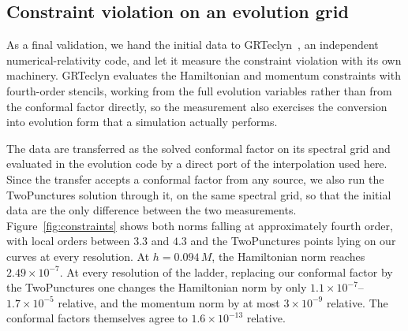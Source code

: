 \documentclass[
  aps,
  prd,
  twocolumn,
  10pt,
  amsmath,
  amssymb,
  nofootinbib,
  superscriptaddress,
  floatfix,
]{revtex4-2}
\begin{document}
\subsection{Constraint violation on an evolution grid}
\label{sec:validation:constraints}

As a final validation, we hand the initial data to GR\-Teclyn~\cite{GRTeclyn}, an
independent numerical-relativity code, and let it measure the
constraint violation with its own machinery. GRTeclyn evaluates the Hamiltonian
and momentum constraints with fourth-order stencils, working from the full evolution
variables rather than from the conformal factor directly, so
the measurement also exercises the conversion into evolution form that a
simulation actually performs.

The data are transferred as the solved conformal factor on its spectral grid and
evaluated in the evolution code by a direct port of the interpolation used here.
Since the transfer accepts a conformal factor from any source, we also run the TwoPunctures solution through
it, on the same spectral grid, so that the initial data are the only difference
between the two measurements. Figure~\ref{fig:constraints} shows both norms
falling at approximately fourth order, with local orders between $3.3$ and $4.3$ and the TwoPunctures points lying on our curves at every resolution.
At $h=0.094\,M$, the Hamiltonian norm reaches $2.49\times10^{-7}$.
At every resolution of the ladder, replacing our conformal factor by the TwoPunctures one changes the Hamiltonian norm by only $1.1\times10^{-7}$--$1.7\times10^{-5}$ relative, and the momentum norm by at most $3\times10^{-9}$ relative.
The conformal factors themselves agree to $1.6\times10^{-13}$ relative.




\end{document}
